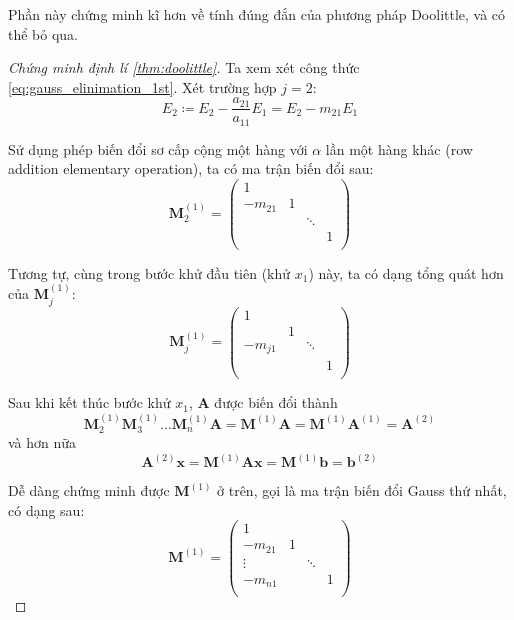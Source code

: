 \documentclass[../../Lectures]{subfiles}
\begin{document}
Phần này chứng minh kĩ hơn về tính đúng đắn của phương pháp Doolittle, và có thể
bỏ qua.

\begin{proof}[Chứng minh định lí \ref{thm:doolittle}]

    Ta xem xét công thức \eqref{eq:gauss_elinimation_1st}. Xét trường hợp \(j =
    2\):
    \[E_2 \coloneqq E_2 - \frac{a_{21}}{a_{11}} E_1 = E_2 - m_{21} E_1\]

    Sử dụng phép biến đổi sơ cấp cộng một hàng với \(\alpha\) lần một hàng khác
    (row addition elementary operation), ta có ma trận biến đổi sau:
    \[
        \bm{M}_2^{(1)} =
            \begin{pmatrix}
                    1    &     &          &     \\
                -m_{21}  &  1  &          &     \\
                         &     &  \ddots  &     \\
                         &     &          &  1  \\
            \end{pmatrix}
    \]

    Tương tự, cùng trong bước khử đầu tiên (khử \(x_1\)) này, ta có dạng tổng
    quát hơn của \(\bm{M}_j^{(1)}\):
    \[
        \bm{M}_j^{(1)} =
            \begin{pmatrix}
                1        &     &          &     \\
                         &  1  &          &     \\
                -m_{j1}  &     &  \ddots  &     \\
                         &     &          &  1  \\
            \end{pmatrix}
    \]

    Sau khi kết thúc bước khử \(x_1\), \(\bm{A}\) được biến đổi thành
    \[
        \bm{M}_2^{(1)} \bm{M}_3^{(1)} \ldots \bm{M}_n^{(1)} \bm{A} = \bm{M}^{(1)} \bm{A} = \bm{M}^{(1)} \bm{A}^{(1)} = \bm{A}^{(2)}
    \]
    và hơn nữa
    \[
        \bm{A}^{(2)} \bm{x} = \bm{M}^{(1)} \bm{A} \bm{x} = \bm{M}^{(1)} \bm{b} = \bm{b}^{(2)}
    \]

    Dễ dàng chứng minh được \(\bm{M}^{(1)}\) ở trên, gọi là ma trận biến đổi
    Gauss thứ nhất, có dạng sau:
    \[
        \bm{M}^{(1)} =
            \begin{pmatrix}
                    1    &     &          &     \\
                -m_{21}  &  1  &          &     \\
                \vdots   &     &  \ddots  &     \\
                -m_{n1}  &     &          &  1  \\
            \end{pmatrix}
    \]


\end{proof}
\end{document}
